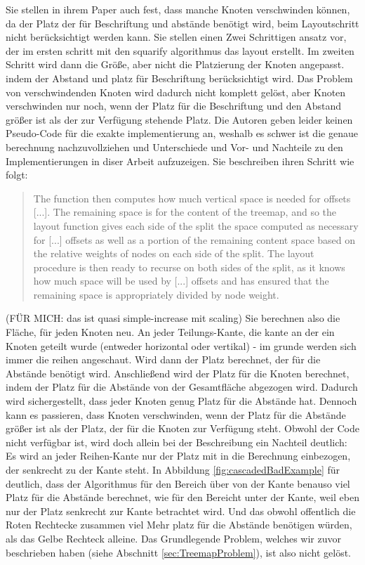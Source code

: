Sie stellen in ihrem Paper auch fest, dass manche Knoten verschwinden können, da der Platz der für Beschriftung und abstände benötigt wird, beim Layoutschritt nicht berücksichtigt werden kann. Sie stellen einen Zwei Schrittigen ansatz vor, der im ersten schritt mit den squarify algorithmus \cite{bruls2000squarified} das layout erstellt. 
Im zweiten Schritt wird dann die Größe, aber nicht die Platzierung der Knoten angepasst. 
indem der Abstand und platz für Beschriftung berücksichtigt wird. Das Problem von verschwindenden Knoten wird dadurch nicht komplett gelöst, aber Knoten verschwinden nur noch, wenn der Platz für die Beschriftung und den Abstand größer ist als der zur Verfügung stehende Platz. Die Autoren geben leider keinen Pseudo-Code für die exakte implementierung an, weshalb es schwer ist die genaue berechnung nachzuvollziehen und Unterschiede und Vor- und Nachteile zu den Implementierungen in diser Arbeit aufzuzeigen.
Sie beschreiben ihren Schritt wie folgt: 
\begin{quote}
    The function then computes how much vertical space is needed for offsets [...]. The remaining space is for the content of the treemap, and so the layout function gives each side of the split the space computed as necessary for [...] offsets as well as a portion of the remaining content space based on the relative weights of nodes on each side of the split. The layout procedure is then ready to recurse on both sides of the split, as it knows how much space will be used by [...] offsets and has ensured that the remaining space is appropriately divided by node weight. \cite[6]{lu2008cascaded}
\end{quote} (FÜR MICH: das ist quasi simple-increase mit scaling)
Sie berechnen also die Fläche, für jeden Knoten neu. An jeder Teilungs-Kante, die kante an der ein Knoten geteilt wurde (entweder horizontal oder vertikal) - im grunde werden sich immer die reihen angeschaut. Wird dann der Platz berechnet, der für die Abstände benötigt wird. Anschließend wird der Platz für die Knoten berechnet, indem der Platz für die Abstände von der Gesamtfläche abgezogen wird. Dadurch wird sichergestellt, dass jeder Knoten genug Platz für die Abstände hat. Dennoch kann es passieren, dass Knoten verschwinden, wenn der Platz für die Abstände größer ist als der Platz, der für die Knoten zur Verfügung steht.
Obwohl der Code nicht verfügbar ist, wird doch allein bei der Beschreibung ein Nachteil deutlich: Es wird an jeder Reihen-Kante nur der Platz mit in die Berechnung einbezogen, der senkrecht zu der Kante steht. In Abbildung \ref{fig:cascadedBadExample} für deutlich, dass der Algorithmus für den Bereich über von der Kante benauso viel Platz für die Abstände berechnet, wie für den Bereicht unter der Kante, weil eben nur der Platz senkrecht zur Kante betrachtet wird. Und das obwohl offentlich die Roten Rechtecke zusammen viel Mehr platz für die Abstände benötigen würden, als das Gelbe Rechteck alleine. 
Das Grundlegende Problem, welches wir zuvor beschrieben haben (siehe Abschnitt \ref{sec:TreemapProblem}), ist also nicht gelöst. 

